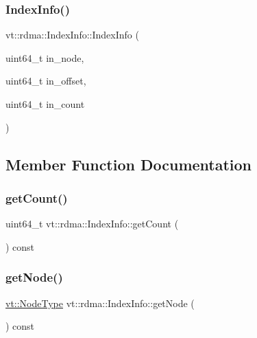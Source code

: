 \subsubsection{\texorpdfstring{Index\+Info()}{IndexInfo()}\hspace{0.1cm}{\footnotesize\ttfamily [3/3]}}
{\footnotesize\ttfamily vt\+::rdma\+::\+Index\+Info\+::\+Index\+Info (\begin{DoxyParamCaption}\item[{uint64\+\_\+t}]{in\+\_\+node,  }\item[{uint64\+\_\+t}]{in\+\_\+offset,  }\item[{uint64\+\_\+t}]{in\+\_\+count }\end{DoxyParamCaption})\hspace{0.3cm}{\ttfamily [inline]}}



\subsection{Member Function Documentation}
\mbox{\label{structvt_1_1rdma_1_1_index_info_ae93f18d7a207ba517af6f7cd06a938bb}} 
\subsubsection{\texorpdfstring{get\+Count()}{getCount()}}
{\footnotesize\ttfamily uint64\+\_\+t vt\+::rdma\+::\+Index\+Info\+::get\+Count (\begin{DoxyParamCaption}{ }\end{DoxyParamCaption}) const\hspace{0.3cm}{\ttfamily [inline]}}

\mbox{\label{structvt_1_1rdma_1_1_index_info_a94944747d01e14bb229837b048067c4f}} 
\subsubsection{\texorpdfstring{get\+Node()}{getNode()}}
{\footnotesize\ttfamily \hyperlink{namespacevt_a866da9d0efc19c0a1ce79e9e492f47e2}{vt\+::\+Node\+Type} vt\+::rdma\+::\+Index\+Info\+::get\+Node (\begin{DoxyParamCaption}{ }\end{DoxyParamCaption}) const\hspace{0.3cm}{\ttfamily [inline]}}

